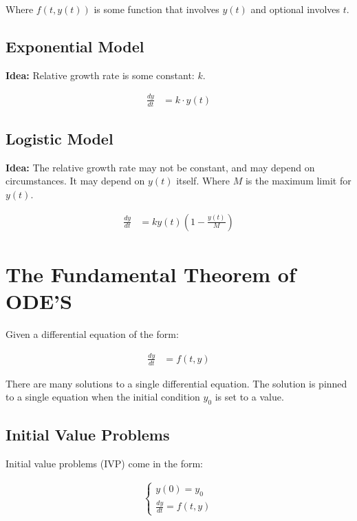 \documentclass{article}
\begin{document}
Where $f(t,y(t))$ is some function that involves $y(t)$ and optional involves
$t$.

\subsection{Exponential Model}\label{sub:exponential_model}

\textbf{Idea:} Relative growth rate is some constant: $k$.

\begin{align}
  \frac{dy}{dt} &= k \cdot y(t)
\end{align}

\subsection{Logistic Model}\label{sub:logistic_model}

\textbf{Idea:} The relative growth rate may not be constant, and may depend on
circumstances. It may depend on $y(t)$ itself. Where $M$ is the maximum limit
for $y(t)$.

\begin{align}
  \frac{dy}{dt} &= ky(t)\left(1-\frac{y(t)}{M}\right)
\end{align}

\section{The Fundamental Theorem of ODE'S}\label{sec:the_fundamental_theorem_of_ode_s}

Given a differential equation of the form:

\begin{align}
  \frac{dy}{dt} &= f(t,y)
\end{align}

There are many solutions to a single differential equation. The solution is
pinned to a single equation when the initial condition $y_0$ is set to a value.

\subsection{Initial Value Problems}\label{sub:initial_value_problems}

Initial value problems (IVP) come in the form:

\begin{align}
  \left\{ \begin{array}{l}
      y\left(0\right) = y_0\\
      \frac{dy}{dt} = f(t,y)
    \end{array}\right.
\end{align}
\end{document}
